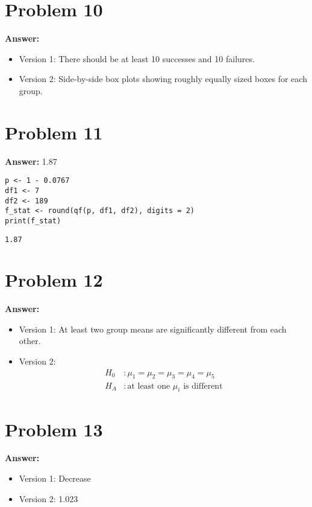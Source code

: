 \documentclass[11pt]{article}
\begin{document}
\section*{Problem 10}
\label{sec:org7fa9f83}

\textbf{Answer:}
\begin{itemize}
\item Version 1: There should be at least 10 successes and 10 failures.
\item Version 2: Side-by-side box plots showing roughly equally sized boxes for each
group.
\end{itemize}
\section*{Problem 11}
\label{sec:org51b070f}

\textbf{Answer:} 1.87

\begin{verbatim}
p <- 1 - 0.0767
df1 <- 7
df2 <- 189
f_stat <- round(qf(p, df1, df2), digits = 2)
print(f_stat)
\end{verbatim}

\label{}
\begin{verbatim}
1.87
\end{verbatim}
\section*{Problem 12}
\label{sec:org592940f}

\textbf{Answer:}
\begin{itemize}
\item Version 1: At least two group means are significantly different from each
other.
\item Version 2:
\begin{align*}
  H_0&:\mu_1=\mu_2=\mu_3=\mu_4=\mu_5\\
  H_A&:\text{at least one }\mu_i\text{ is different}
\end{align*}
\end{itemize}
\section*{Problem 13}
\label{sec:orgf2db6fb}

\textbf{Answer:}
\begin{itemize}
\item Version 1: Decrease
\item Version 2: 1.023
\end{itemize}
\end{document}
